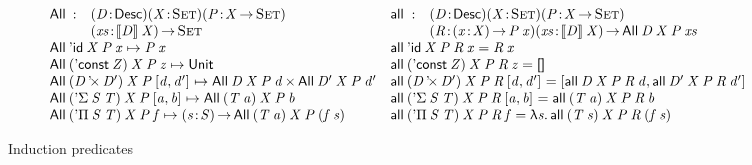 \begin{figure*}

\[
\begin{array}{ll}
\stk{
\begin{array}{@{}ll}
\All{\!}{\!}{\!}{\!} : & \PITEL{\V{D}}{\Desc}
                         \PITEL{\V{X}}{\Set}
                         \PITEL{\V{P}}{\V{X} \To \Set} \\
                       & \PI{\V{xs}}{\descop{\V{D}}{\V{X}}} 
                         \Set 
\end{array} \\
\All{\DId}{\V{X}}{\V{P}}{\V{x}} \mapsto \V{P}\: \V{x} \\
\All{(\DConst{\V{Z}})}{\V{X}}{\V{P}}{\V{z}} \mapsto 
    \Unit \\
\All{(\DProd{\V{D}}{\V{D'}})}{\V{X}}{\V{P}}{\pair{\V{d}}{\V{d'}}{}} \mapsto 
    \TIMES{\All{\V{D}}{\V{X}}{\V{P}}{\V{d}}}{\All{\V{D'}}{\V{X}}{\V{P}}{\V{d'}}} \\
\All{(\DSigma{\V{S}}{\V{T}})}{\V{X}}{\V{P}}{\pair{\V{a}}{\V{b}}{}} \mapsto 
    \All{(\V{T}\: \V{a})}{\V{X}}{\V{P}}{\V{b}} \\
\All{(\DPi{\V{S}}{\V{T}})}{\V{X}}{\V{P}}{\V{f}} \mapsto 
    \PI{\V{\V{s}}}{\V{S}} \All{(\V{T}\: \V{a})}{\V{X}}{\V{P}}{(\V{f}\: \V{s})}
}
&
\stk{
\begin{array}{@{}ll}
\all{\!}{\!}{\!}{\!}{\!} : & \PITEL{\V{D}}{\Desc}
                             \PITEL{\V{X}}{\Set}
                             \PITEL{\V{P}}{\V{X} \To \Set} \\
                           & \PITEL{\V{R}}{\PI{\V{x}}{\V{X}} \V{P}\: \V{x}}
                             \PI{\V{xs}}{\descop{\V{D}}{\V{X}}} 
                             \All{\V{D}}{\V{X}}{\V{P}}{\V{xs}} 
\end{array} \\
\all{\DId}{\V{X}}{\V{P}}{\V{R}}{\V{x}} = 
    \V{R}\: \V{x} \\
\all{(\DConst{\V{Z}})}{\V{X}}{\V{P}}{\V{R}}{\V{z}} = 
    \Void \\
\all{(\DProd{\V{D}}{\V{D'}})}{\V{X}}{\V{P}}{\V{R}}{\pair{\V{d}}{\V{d'}}{}} =
    \pair{\all{\V{D}}{\V{X}}{\V{P}}{\V{R}}{\V{d}}}{\all{\V{D'}}{\V{X}}{\V{P}}{\V{R}}{\V{d'}}}{} \\
\all{(\DSigma{\V{S}}{\V{T}})}{\V{X}}{\V{P}}{\V{R}}{\pair{\V{a}}{\V{b}}{}} = 
    \all{(\V{T}\: \V{a})}{\V{X}}{\V{P}}{\V{R}}{\V{b}} \\
\all{(\DPi{\V{S}}{\V{T}})}{\V{X}}{\V{P}}{\V{R}}{\V{f}} = 
    \LAM{\V{s}} \all{(\V{T}\: \V{s})}{\V{X}}{\V{P}}{\V{R}}{(\V{f}\: \V{s})}
\end{array}
}
\]

\caption{Induction predicates}
\label{fig:all-predicates}

\end{figure*}

